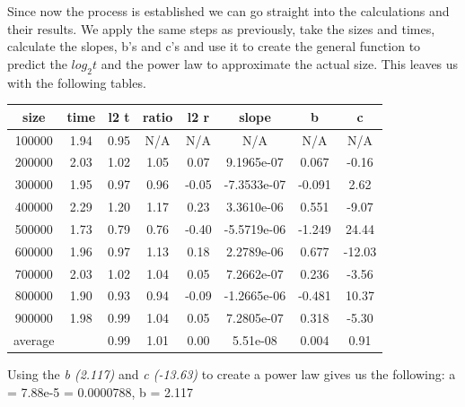 \documentclass[12pt]{article}
\begin{document}
Since now the process is established we can go straight into the calculations and their results.
We apply the same steps as previously, take the sizes and times, calculate the slopes, b's and c's
and use it to create the general function to predict the $log_2 t$ and the power law to approximate
the actual size. This leaves us with the following tables.

\begin{table}[h]
    \centering
    \begin{tabular}{|c|c|c|c|c|c|c|c|}
        \hline size &	time &	l2 t &	ratio &	l2 r &	slope &	b &	c \\
        \hline 100000 &	1.94 &	0.95 &	N/A &	N/A &	N/A &	N/A &	N/A \\
        \hline 200000 &	2.03 &	1.02 &	1.05 &	0.07 &	9.1965e-07 &	0.067 &	-0.16 \\
        \hline 300000 &	1.95 &	0.97 &	0.96 &	-0.05 &	-7.3533e-07 &	-0.091 &	2.62 \\
        \hline 400000 &	2.29 &	1.20 &	1.17 &	0.23 &	3.3610e-06 &	0.551 &	-9.07 \\
        \hline 500000 &	1.73 &	0.79 &	0.76 &	-0.40 &	-5.5719e-06 &	-1.249 &	24.44 \\
        \hline 600000 &	1.96 &	0.97 &	1.13 &	0.18 &	2.2789e-06 &	0.677 &	-12.03 \\
        \hline 700000 &	2.03 &	1.02 &	1.04 &	0.05 &	7.2662e-07 &	0.236 &	-3.56 \\
        \hline 800000 &	1.90 &	0.93 &	0.94 &	-0.09 &	-1.2665e-06 &	-0.481 &	10.37 \\
        \hline 900000 &	1.98 &	0.99 &	1.04 &	0.05 &	7.2805e-07 &	0.318 &	-5.30 \\
        \hline average &	& 0.99 &	1.01 &	0.00 &	5.51e-08 &	0.004 &	0.91 \\
        \hline
    \end{tabular}
    \label{tab:quickunion}
\end{table}

Using the \emph{b (2.117)} and \emph{c (-13.63)} to create a power law gives us the following:
a = 7.88e-5 = 0.0000788, b = 2.117
\end{document}
